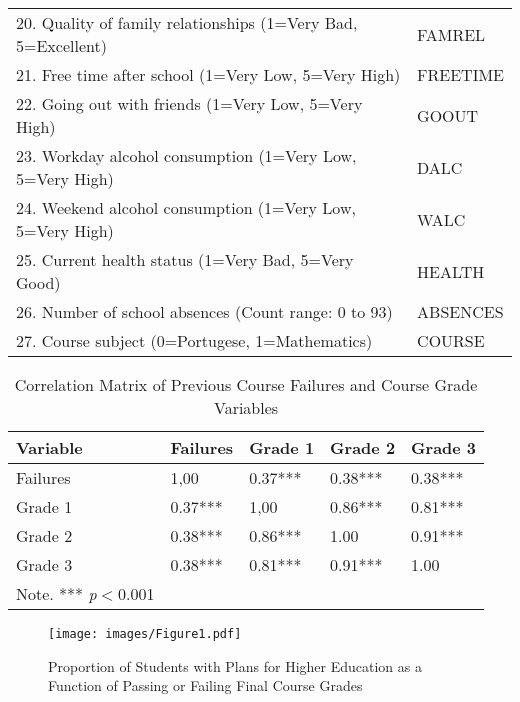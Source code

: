 \documentclass[sigconf]{acmart}
\begin{document}
\begin{table*}[ht]
\begin{tabular}{ll}
    20. Quality of family relationships (1=Very Bad, 5=Excellent) & FAMREL  \\
    21. Free time after school (1=Very Low, 5=Very High) & FREETIME  \\
    22. Going out with friends (1=Very Low, 5=Very High) & GOOUT  \\
    23. Workday alcohol consumption (1=Very Low, 5=Very High) & DALC  \\
    24. Weekend alcohol consumption (1=Very Low, 5=Very High) & WALC  \\
    25. Current health status (1=Very Bad, 5=Very Good) & HEALTH  \\ 
    26. Number of school absences (Count range: 0 to 93) & ABSENCES  \\
    27. Course subject (0=Portugese, 1=Mathematics) & COURSE  \\
    
    \bottomrule
  \end{tabular}
\end{table*}




\begin{table}
  \caption{Correlation Matrix of Previous Course Failures and Course Grade 
  Variables}
  \label{tab:freq}
  \begin{tabular}{lllll}
    \toprule
    Variable    & Failures  & Grade 1 & Grade 2 & Grade 3  \\
    \midrule
    Failures    &  1,00     &  0.37***  & 0.38***   &  0.38***  \\
    Grade 1     &  0.37***  &  1,00     & 0.86***   &  0.81***  \\
    Grade 2     &  0.38***  &  0.86***  & 1.00      &  0.91***  \\  
    Grade 3     &  0.38***  &  0.81***  & 0.91***   &  1.00     \\    
    \bottomrule
    Note. *** \textit{p}$<$0.001 & & &
  \end{tabular}
\end{table}


\begin{figure}[!ht]
  \centering\texttt{[image: images/Figure1.pdf]}
  \caption{Proportion of Students with Plans for Higher Education as a 
  Function of Passing or Failing Final Course Grades}
  \label{f:Figure1}
\end{figure} 
 
\end{document}
